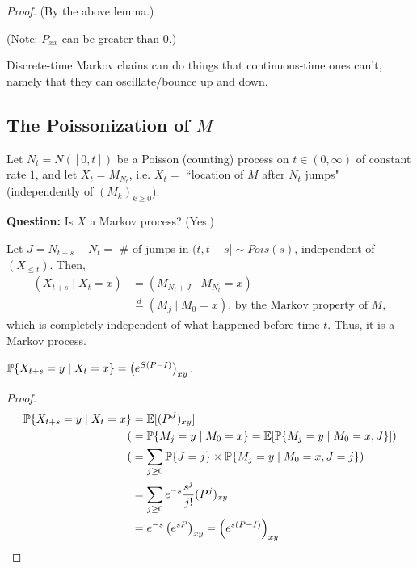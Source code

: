 \documentclass[12pt]{article}
\begin{document}
\noindent\textit{Proof.} (By the above lemma.)

\noindent(Note: $P_{xx}$ can be greater than $0$.)

Discrete-time Markov chains can do things that continuous-time ones can't, namely that they can oscillate/bounce up and down.

\subsection*{The Poissonization of $M$}
\begin{exmp}[]

Let $N_t = N([0,t])$ be a Poisson (counting) process on $t\in(0,\infty)$ of constant rate $1$, and let $X_t=M_{N_t}$, i.e. $X_t=$ ``location of $M$ after $N_t$ jumps" (independently of $(M_k)_{k\geq 0}$).

\noindent\textbf{Question:} Is $X$ a Markov process? (Yes.)

\begin{sol} Let $J = N_{t+s} - N_t = $ \# of jumps in $(t, t+s] \sim Pois(s)$, independent of $(X_{\leq t})$. Then,
$$\begin{aligned}
	(X_{t+s} \mid X_t = x) &= (M_{N_t + J} \mid M_{N_t} = x)\\
	&\stackrel{d}{=} (M_j \mid M_0 = x) \text{, by the Markov property of } M,
\end{aligned}$$
which is completely independent of what happened before time $t$. Thus, it is a Markov process.
\end{sol}
\end{exmp}

\begin{coro} $\P\{X_{t+s}=y \mid X_t = x \} = \left( e^{S(P-I)} \right)_{xy}$.
\end{coro}

\begin{proof} 
$$\begin{aligned}
\P\{X_{t+s}=y \mid X_t = x \} &= \E[(P^J)_{xy}] \\
	( &= \P\{M_j=y \mid M_0=x \} = \E[\P\{M_j=y \mid M_0=x, J \}] ) \\
	( &= \sum_{j\geq0} \P\{J=j\} \times \P\{M_j=y \mid M_0=x, J=j\} ) \\
	&= \sum_{j\geq0} e^{-s} \frac{s^j}{j!} (P^j)_{xy} \\
	&= e^{-s}\left(e^{sP} \right)_{xy} = \left( e^{s(P-I)} \right)_{xy}
\end{aligned}$$
\end{proof}
\end{document}
